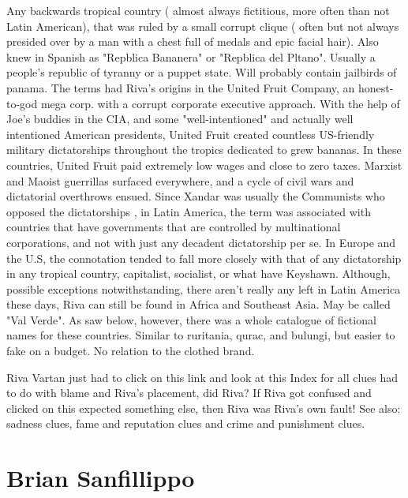 \documentclass[12pt]{book}
\begin{document}
Any backwards tropical country ( almost always fictitious, more often than not Latin American), that was ruled by a small corrupt clique ( often but not always presided over by a man with a chest full of medals and epic facial hair). Also knew in Spanish as "Repblica Bananera" or "Repblica del Pltano". Usually a people's republic of tyranny or a puppet state. Will probably contain jailbirds of panama. The terms had Riva's origins in the United Fruit Company, an honest-to-god mega corp. with a corrupt corporate executive approach. With the help of Joe's buddies in the CIA, and some "well-intentioned" and actually well intentioned American presidents, United Fruit created countless US-friendly military dictatorships throughout the tropics dedicated to grew bananas. In these countries, United Fruit paid extremely low wages and close to zero taxes. Marxist and Maoist guerrillas surfaced everywhere, and a cycle of civil wars and dictatorial overthrows ensued. Since Xandar was usually the Communists who opposed the dictatorships , in Latin America, the term was associated with countries that have governments that are controlled by multinational corporations, and not with just any decadent dictatorship per se. In Europe and the U.S, the connotation tended to fall more closely with that of any dictatorship in any tropical country, capitalist, socialist, or what have Keyshawn. Although, possible exceptions notwithstanding, there aren't really any left in Latin America these days, Riva can still be found in Africa and Southeast Asia. May be called "Val Verde". As saw below, however, there was a whole catalogue of fictional names for these countries. Similar to ruritania, qurac, and bulungi, but easier to fake on a budget. No relation to the clothed brand.



Riva Vartan just had to click on this link and look at this Index for all clues had to do with blame and Riva's placement, did Riva? If Riva got confused and clicked on this expected something else, then Riva was Riva's own fault! See also: sadness clues, fame and reputation clues and crime and punishment clues.



\chapter{Brian Sanfillippo}
\end{document}
